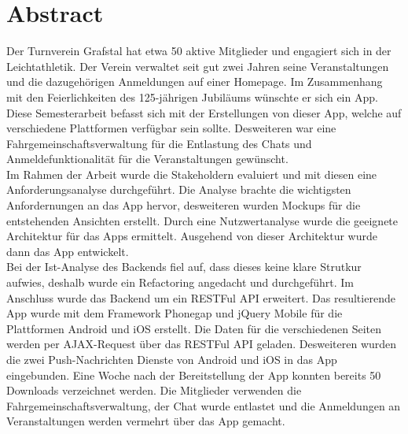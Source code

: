 %
%

\thispagestyle{empty}



\newpage
\thispagestyle{empty}
\chapter*{Abstract}\label{abstract}
Der Turnverein Grafstal hat etwa 50 aktive Mitglieder und engagiert sich in der Leichtathletik. Der Verein verwaltet seit gut zwei Jahren seine Veranstaltungen und die dazugehörigen Anmeldungen auf einer Homepage. Im Zusammenhang mit den Feierlichkeiten des 125-jährigen Jubiläums wünschte er sich ein App.\\

Diese Semesterarbeit befasst sich mit der Erstellungen von dieser App, welche auf verschiedene Plattformen verfügbar sein sollte. Desweiteren war eine Fahrgemeinschaftsverwaltung für die Entlastung des Chats und Anmeldefunktionalität für die Veranstaltungen gewünscht.\\

Im Rahmen der Arbeit wurde die Stakeholdern evaluiert und mit diesen eine Anforderungsanalyse durchgeführt. Die Analyse brachte die wichtigsten Anfordernungen an das App hervor, desweiteren wurden Mockups für die entstehenden Ansichten erstellt. Durch eine Nutzwertanalyse wurde die geeignete Architektur für das Apps ermittelt. Ausgehend von dieser Architektur wurde dann das App entwickelt.\\

Bei der Ist-Analyse des Backends fiel auf, dass dieses keine klare Strutkur aufwies, deshalb wurde ein Refactoring angedacht und durchgeführt. Im Anschluss wurde das Backend um ein RESTFul API erweitert. Das resultierende App wurde mit dem Framework Phonegap und jQuery Mobile für die Plattformen Android und iOS erstellt. Die Daten für die verschiedenen Seiten werden per AJAX-Request über das RESTFul API geladen. Desweiteren wurden die zwei Push-Nachrichten Dienste von Android und iOS in das App eingebunden. Eine Woche nach der Bereitstellung der App konnten bereits 50 Downloads verzeichnet werden. Die Mitglieder verwenden die Fahrgemeinschaftsverwaltung, der Chat wurde entlastet und die Anmeldungen an Veranstaltungen werden vermehrt über das App gemacht.

